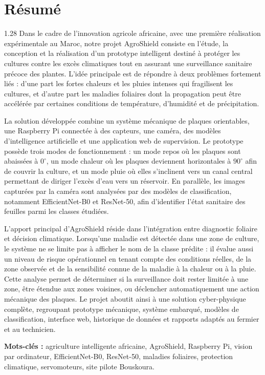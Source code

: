 ﻿\documentclass[11pt,a4paper,openany]{report}
\newenvironment{frontmattertext}
  {\begin{spacing}{1.28}\normalsize\setlength{\parskip}{10pt}}
  {\end{spacing}}
\begin{document}
\chapter*{Résumé}
\vspace{0.35cm}
\begin{frontmattertext}
Dans le cadre de l'innovation agricole africaine, avec une première réalisation expérimentale au Maroc, notre projet AgroShield consiste en l'étude, la conception et la réalisation d'un prototype intelligent destiné à protéger les cultures contre les excès climatiques tout en assurant une surveillance sanitaire précoce des plantes. L'idée principale est de répondre à deux problèmes fortement liés : d'une part les fortes chaleurs et les pluies intenses qui fragilisent les cultures, et d'autre part les maladies foliaires dont la propagation peut être accélérée par certaines conditions de température, d'humidité et de précipitation.

La solution développée combine un système mécanique de plaques orientables, une Raspberry Pi connectée à des capteurs, une caméra, des modèles d'intelligence artificielle et une application web de supervision. Le prototype possède trois modes de fonctionnement : un mode repos où les plaques sont abaissées à \(0^\circ\), un mode chaleur où les plaques deviennent horizontales à \(90^\circ\) afin de couvrir la culture, et un mode pluie où elles s'inclinent vers un canal central permettant de diriger l'excès d'eau vers un réservoir. En parallèle, les images capturées par la caméra sont analysées par des modèles de classification, notamment EfficientNet-B0 et ResNet-50, afin d'identifier l'état sanitaire des feuilles parmi les classes étudiées.

L'apport principal d'AgroShield réside dans l'intégration entre diagnostic foliaire et décision climatique. Lorsqu'une maladie est détectée dans une zone de culture, le système ne se limite pas à afficher le nom de la classe prédite : il évalue aussi un niveau de risque opérationnel en tenant compte des conditions réelles, de la zone observée et de la sensibilité connue de la maladie à la chaleur ou à la pluie. Cette analyse permet de déterminer si la surveillance doit rester limitée à une zone, être étendue aux zones voisines, ou déclencher automatiquement une action mécanique des plaques. Le projet aboutit ainsi à une solution cyber-physique complète, regroupant prototype mécanique, système embarqué, modèles de classification, interface web, historique de données et rapports adaptés au fermier et au technicien.

\textbf{Mots-clés :} agriculture intelligente africaine, AgroShield, Raspberry Pi, vision par ordinateur, EfficientNet-B0, ResNet-50, maladies foliaires, protection climatique, servomoteurs, site pilote Bouskoura.
\end{frontmattertext}
\end{document}
